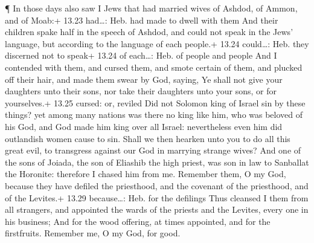  ¶ In those days also saw I Jews that had married wives of
Ashdod, of Ammon, and of Moab:+ 13.23 had\ldots: Heb. had made to dwell
with them  And their children spake half in the speech of
Ashdod, and could not speak in the Jews' language, but according to the
language of each people.+ 13.24 could\ldots: Heb. they discerned not to
speak+ 13.24 of each\ldots: Heb. of people and people  And
I contended with them, and cursed them, and smote certain of them, and
plucked off their hair, and made them swear by God, saying, Ye shall not
give your daughters unto their sons, nor take their daughters unto your
sons, or for yourselves.+ 13.25 cursed: or, reviled  Did
not Solomon king of Israel sin by these things? yet among many nations
was there no king like him, who was beloved of his God, and God made him
king over all Israel: nevertheless even him did outlandish women cause
to sin.  Shall we then hearken unto you to do all this
great evil, to transgress against our God in marrying strange wives?
 And one of the sons of Joiada, the son of Eliashib the
high priest, was son in law to Sanballat the Horonite: therefore I
chased him from me.  Remember them, O my God, because they
have defiled the priesthood, and the covenant of the priesthood, and of
the Levites.+ 13.29 because\ldots: Heb. for the defilings 
Thus cleansed I them from all strangers, and appointed the wards of the
priests and the Levites, every one in his business;  And
for the wood offering, at times appointed, and for the firstfruits.
Remember me, O my God, for good.
